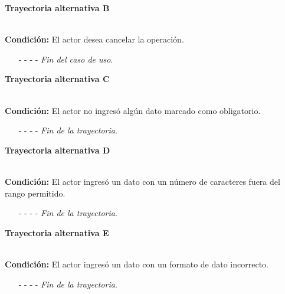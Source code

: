 \hypertarget{CU7-1-2:TAB}{\textbf{Trayectoria alternativa B}}\\
\noindent \textbf{Condición:} El actor desea cancelar la operación.
\begin{enumerate}
	\UCpaso[\UCactor] Solicita cancelar la operación oprimiendo el botón  de la pantalla 
	\UCpaso[\UCsist] Muestra la pantalla  ó .
	\item[- -] - - {\em {Fin del caso de uso}}.%
\end{enumerate}
\hypertarget{CU7-1-2:TAC}{\textbf{Trayectoria alternativa C}}\\
\noindent \textbf{Condición:} El actor no ingresó algún dato marcado como obligatorio.
\begin{enumerate}
	\UCpaso[\UCsist] Muestra el mensaje  señalando el campo que presenta el error en la pantalla .
	\UCpaso Regresa al paso \ref{CU7.1.2-P4} de la trayectoria principal.
	\item[- -] - - {\em {Fin de la trayectoria}}.%
\end{enumerate}
\hypertarget{CU7-1-2:TAD}{\textbf{Trayectoria alternativa D}}\\
\noindent \textbf{Condición:} El actor ingresó un dato con un número de caracteres fuera del rango permitido.
\begin{enumerate}
	\UCpaso[\UCsist] Muestra el mensaje  señalando el campo que presenta el error en la pantalla .
	\UCpaso Regresa al paso \ref{CU7.1.2-P4} de la trayectoria principal.
	\item[- -] - - {\em {Fin de la trayectoria}}.%
\end{enumerate}
\hypertarget{CU7-1-2:TAE}{\textbf{Trayectoria alternativa E}}\\
\noindent \textbf{Condición:} El actor ingresó un dato con un formato de dato incorrecto.
\begin{enumerate}
	\UCpaso[\UCsist] Muestra el mensaje  señalando el campo que presenta el error en la pantalla .
	\UCpaso Regresa al paso \ref{CU7.1.2-P4} de la trayectoria principal.
	\item[- -] - - {\em {Fin de la trayectoria}}.
\end{enumerate}
